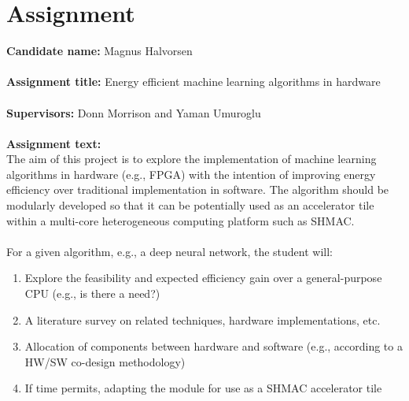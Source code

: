 \section*{Assignment}

\textbf{Candidate name:} Magnus Halvorsen \\ \hfil \\ \hfil
\textbf{Assignment title:} Energy efficient machine learning algorithms in hardware \\ \hfil \\ \hfil
\textbf{Supervisors:} Donn Morrison and Yaman Umuroglu \\ \hfil \\ \hfil
\textbf{Assignment text:} \\ \hfil
The aim of this project is to explore the implementation of machine learning algorithms in hardware (e.g., FPGA) with the intention of improving energy efficiency over traditional implementation in software. The algorithm should be modularly developed so that it can be potentially used as an accelerator tile within a multi-core heterogeneous computing platform such as SHMAC. \\ \hfil \\ \hfil
For a given algorithm, e.g., a deep neural network, the student will:

\begin{enumerate}
	
	\item Explore the feasibility and expected efficiency gain over a general-purpose CPU (e.g., is there a need?)
	
	\item A literature survey on related techniques, hardware implementations, etc.
	
	\item Allocation of components between hardware and software (e.g., according to a HW/SW co-design methodology)
	
	\item If time permits, adapting the module for use as a SHMAC accelerator tile
	
\end{enumerate}